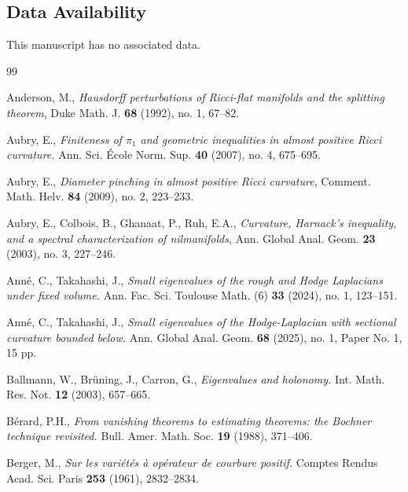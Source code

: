 \documentclass[12pt, twoside]{article}
\theoremstyle{definition}
\numberwithin{equation}{section}
\begin{document}
	\subsection*{Data Availability}
	This manuscript has no associated data.
	
	
	
	
	
	
	
	
	
	\bigskip
	\footnotesize
	
	\begin{thebibliography}{99}
		
		Anderson, M., \emph{Hausdorff perturbations of Ricci-flat manifolds and the splitting theorem}, Duke Math. J. \textbf{68} (1992), no. 1, 67--82.
		
		Aubry, E.,  
		\textit{Finiteness of $\pi_{1}$ and geometric inequalities in almost positive Ricci curvature.} 
        Ann. Sci. École Norm. Sup. \textbf{40} (2007), no. 4, 675--695.
		
		Aubry, E., \emph{Diameter pinching in almost positive Ricci curvature}, Comment. Math. Helv. \textbf{84} (2009), no. 2, 223--233.
		
		Aubry, E., Colbois, B., Ghanaat, P., Ruh, E.A., \emph{Curvature, Harnack's inequality, and a spectral characterization of nilmanifolds}, Ann. Global Anal. Geom. \textbf{23} (2003), no. 3, 227--246.
		
		Ann\'{e}, C., Takahashi, J.,
		\emph{Small eigenvalues of the rough and Hodge Laplacians under fixed volume.}
		Ann. Fac. Sci. Toulouse Math. (6) \textbf{33} (2024), no. 1, 123--151. 	
		
		Ann\'{e}, C., Takahashi, J.,	
		\emph{Small eigenvalues of the Hodge-Laplacian with sectional curvature bounded below.}
		Ann. Global Anal. Geom. \textbf{68} (2025), no. 1, Paper No. 1, 15 pp. 
		
		Ballmann, W., Br\"{u}ning, J., Carron, G.,
		\emph{Eigenvalues and holonomy.} Int. Math. Res. Not. \textbf{12} (2003), 657--665.
		
		 Bérard, P.H., \emph{From vanishing theorems to estimating theorems: the Bochner technique revisited.} Bull. Amer. Math. Soc. \textbf{19} (1988), 371--406.
		
		Berger, M., \emph{Sur les variétés à opérateur de courbure positif.} Comptes Rendus Acad. Sci. Paris \textbf{253} (1961), 2832--2834.
		

\end{thebibliography}
\end{document}
